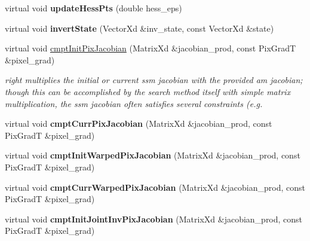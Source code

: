 \begin{DoxyCompactItemize}
\item 
\hypertarget{classStateSpaceModel_a1001d4563a839aadad2b59d5c1ea4847}{virtual void {\bfseries update\-Hess\-Pts} (double hess\-\_\-eps)}\label{classStateSpaceModel_a1001d4563a839aadad2b59d5c1ea4847}

\item 
\hypertarget{classStateSpaceModel_a4273b406876eaae7afaa18d954955c0b}{virtual void {\bfseries invert\-State} (Vector\-Xd \&inv\-\_\-state, const Vector\-Xd \&state)}\label{classStateSpaceModel_a4273b406876eaae7afaa18d954955c0b}

\item 
virtual void \hyperlink{classStateSpaceModel_ac956c679581e746891c62755fe715b3b}{cmpt\-Init\-Pix\-Jacobian} (Matrix\-Xd \&jacobian\-\_\-prod, const Pix\-Grad\-T \&pixel\-\_\-grad)
\begin{DoxyCompactList}\small\item\em right multiplies the initial or current ssm jacobian with the provided am jacobian; though this can be accomplished by the search method itself with simple matrix multiplication, the ssm jacobian often satisfies several constraints (e.\-g. \end{DoxyCompactList}\item 
\hypertarget{classStateSpaceModel_a75424ecb8dae29778dd92a55e11bce04}{virtual void {\bfseries cmpt\-Curr\-Pix\-Jacobian} (Matrix\-Xd \&jacobian\-\_\-prod, const Pix\-Grad\-T \&pixel\-\_\-grad)}\label{classStateSpaceModel_a75424ecb8dae29778dd92a55e11bce04}

\item 
\hypertarget{classStateSpaceModel_a1e774953788e1499c9d42c4b3c1b3103}{virtual void {\bfseries cmpt\-Init\-Warped\-Pix\-Jacobian} (Matrix\-Xd \&jacobian\-\_\-prod, const Pix\-Grad\-T \&pixel\-\_\-grad)}\label{classStateSpaceModel_a1e774953788e1499c9d42c4b3c1b3103}

\item 
\hypertarget{classStateSpaceModel_ac0b9d1593ca91e6e9b0de9e8b0cf1e6d}{virtual void {\bfseries cmpt\-Curr\-Warped\-Pix\-Jacobian} (Matrix\-Xd \&jacobian\-\_\-prod, const Pix\-Grad\-T \&pixel\-\_\-grad)}\label{classStateSpaceModel_ac0b9d1593ca91e6e9b0de9e8b0cf1e6d}

\item 
\hypertarget{classStateSpaceModel_a9f0c3dadb8a24c1f51b879dadce129ee}{virtual void {\bfseries cmpt\-Init\-Joint\-Inv\-Pix\-Jacobian} (Matrix\-Xd \&jacobian\-\_\-prod, const Pix\-Grad\-T \&pixel\-\_\-grad)}\label{classStateSpaceModel_a9f0c3dadb8a24c1f51b879dadce129ee}


\end{DoxyCompactItemize}

